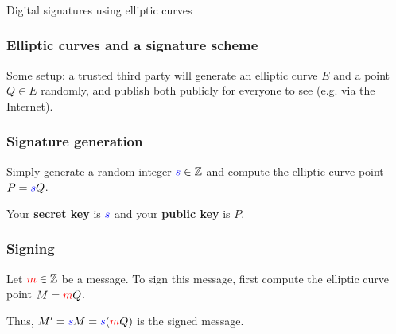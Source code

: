 \documentclass{beamer} %
\theoremstyle{definition} %
\begin{document}
\begin{frame}
\frametitle{\;}

\begin{center}
\Large{Digital signatures using elliptic curves}
\end{center}

\end{frame}


\begin{frame}

\frametitle{Elliptic curves and a signature scheme}

Some setup: a trusted third party will generate an elliptic curve $E$ and a point $Q \in E$ randomly, and publish both publicly for everyone to see (e.g. via the Internet).

\begin{center}
\end{center}

\end{frame}


\begin{frame}

\frametitle{Signature generation}

Simply generate a random integer $\textcolor{blue}{s} \in \mathbb{Z}$ and compute the elliptic curve point $P = \textcolor{blue}{s}Q$.  

\begin{center}
\end{center}

Your \textbf{secret key} is $\textcolor{blue}{s}$ and your \textbf{public key} is $P$.

\end{frame}

\begin{frame}

\frametitle{Signing}

Let $\textcolor{red}{m} \in \mathbb{Z}$ be a message.  \pause To sign this message, first compute the elliptic curve point $M = \textcolor{red}{m}Q$.  

\begin{center}
\end{center}

Thus, $M' = \textcolor{blue}{s}M = \textcolor{blue}{s}(\textcolor{red}{m}Q)$ is the signed message.
\end{frame}
\end{document}
